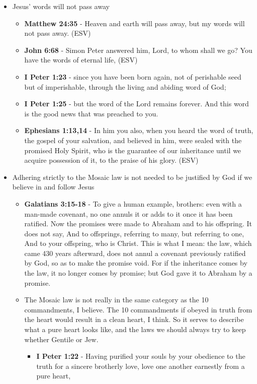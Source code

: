 \documentclass[11pt]{article}
\begin{document}
\begin{itemize}
\item Jesus' words will not pass away
\begin{itemize}
\item \textbf{Matthew 24:35} - Heaven and earth will pass away, but my words will not pass away.  (ESV)
\item \textbf{John 6:68} -  Simon Peter answered him, Lord, to whom shall we go?  You have the words of eternal life,  (ESV)
\item \textbf{I Peter 1:23} - since you have been born again, not of perishable seed but of imperishable, through the living and abiding word of God;
\item \textbf{I Peter 1:25} - but the word of the Lord remains forever. And this word is the good news that was preached to you.
\item \textbf{Ephesians 1:13,14} -  In him you also, when you heard the word of truth, the gospel of your salvation, and believed in him, were sealed with the promised Holy Spirit, who is the guarantee of our inheritance until we acquire possession of it, to the praise of his glory.  (ESV)
\end{itemize}
\item Adhering strictly to the Mosaic law is not needed to be justified by God if we believe in and follow Jesus
\begin{itemize}
\item \textbf{Galatians 3:15-18} - To give a human example, brothers: even with a man-made covenant, no one annuls it or adds to it once it has been ratified. Now the promises were made to Abraham and to his offspring. It does not say, And to offsprings, referring to many, but referring to one, And to your offspring, who is Christ. This is what I mean: the law, which came 430 years afterward, does not annul a covenant previously ratified by God, so as to make the promise void. For if the inheritance comes by the law, it no longer comes by promise; but God gave it to Abraham by a promise.
\item The Mosaic law is not really in the same category as the 10 commandments, I believe. The 10 commandments if obeyed in truth from the heart would result in a clean heart, I think. So it serves to describe what a pure heart looks like, and the laws we should always try to keep whether Gentile or Jew.
\begin{itemize}
\item \textbf{I Peter 1:22} - Having purified your souls by your obedience to the truth for a sincere brotherly love, love one another earnestly from a pure heart,

\end{itemize}
\end{itemize}
\end{itemize}
\end{document}
